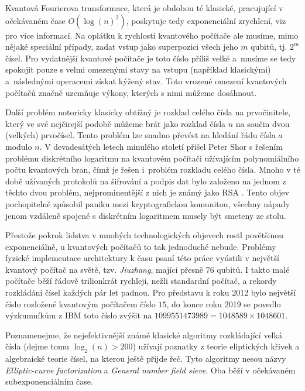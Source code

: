 \documentclass[12pt]{report}
\begin{document}
Kvantová Fourierova transformace, která je obdobou té klasické, pracujující v očekávaném čase $O(\log (n)^2)$, poskytuje tedy exponenciální zrychlení, viz \cite[Ch. 4. a 5.]{Chuang} pro více informací. Na oplátku k rychlosti kvantového počítače ale musíme, mimo nějaké speciální případy, zadat vstup jako superpozici všech jeho $m$ qubitů, tj. $2^m$ čísel. Pro vydatnější kvantové počítače je toto číslo příliš velké a~musíme se tedy spokojit pouze s velmi omezenými stavy na vstupu (například klasickými) a~následnými operacemi získat kýžený stav. Toto vrozené omezení kvantových počítačů značně uzemňuje výkony, kterých s nimi můžeme dosáhnout.
 
Další problém notoricky klasicky obtížný je rozklad celého čísla na prvočinitele, který ve své nejčirejší podobě můžeme brát jako rozklad čísla $n$ na součin dvou (velkých) prvočísel. Tento problém lze snadno převést na hledání řádu čísla $a$ modulo $n$. V devadesátých letech minulého století přišel Peter Shor \cite{Shor} s řešením problému diskrétního logaritmu na kvantovém počítači užívajícím polynomiálního počtu kvantových bran, čímž je řešen i~problém rozkladu celého čísla. Mnoho v té době užívaných protokolů na šifrování a podpis dat bylo založeno na jednom z těchto dvou problém, nejprominentější z nich je známý jako RSA \cite{RSA}. Tento objev pochopitelně způsobil paniku mezi kryptografickou komunitou, všechny nápady jenom vzdáleně spojené s diskrétním logaritmem musely být smeteny ze stolu.

Přestože pokrok lidstva v mnohých technologických objevech rostl povětšinou exponenciálně, u kvantových počítačů to tak jednoduché nebude. Problémy fyzické implementace architektury k času psaní této práce vyústili v největší kvantový počítač na světě, tzv. \textit{Jiuzhang}, mající přesně $76$ qubitů. I takto malé počítače běží řádově trilionkrát rychleji, nežli standardní počítač, a rekordy rozkládání čísel každých pár let padnou. Pro představu k roku 2012 bylo největší číslo rozložené kvantovým počítačem číslo $15$, do konce roku 2019 se povedlo výzkumníkům z IBM \cite{Karamlou} toto číslo zvýšit na $1099551473989 = 1048589 \times 1048601$.

Poznamenejme, že nejefektivnější známé klasické algoritmy rozkládající velká čísla (dejme tomu $\log_2(n)>200$) užívají poznatky z teorie eliptických křivek a algebraické teorie čísel, na kterou ještě přijde řeč. Tyto algoritmy nesou názvy \textit{Elliptic-curve factorization} a \textit{General number field sieve}. Oba běží v očekávaném subexponenciálním čase.
\end{document}
